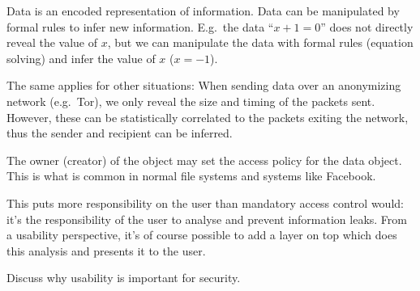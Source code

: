   \begin{solution}
  Data is an encoded representation of information.
  Data can be manipulated by formal rules to infer new information.
  E.g.\ the data \enquote{\(x+1 = 0\)} does not directly reveal the value of 
  \(x\), but we can manipulate the data with formal rules (equation solving) 
  and infer the value of \(x\) (\(x = -1\)).

  The same applies for other situations:
  When sending data over an anonymizing network (e.g.\ Tor), we only reveal the 
  size and timing of the packets sent.
  However, these can be statistically correlated to the packets exiting the 
  network, thus the sender and recipient can be inferred.
  \end{solution}
\question[3]

\begin{solution}
  The owner (creator) of the object may set the access policy for the data 
  object.
  This is what is common in normal file systems and systems like Facebook.

  This puts more responsibility on the user than mandatory access control 
  would: it's the responsibility of the user to analyse and prevent information 
  leaks.
  From a usability perspective, it's of course possible to add a layer on top 
  which does this analysis and presents it to the user.
\end{solution}


\question[3]
  Discuss why usability is important for security.

